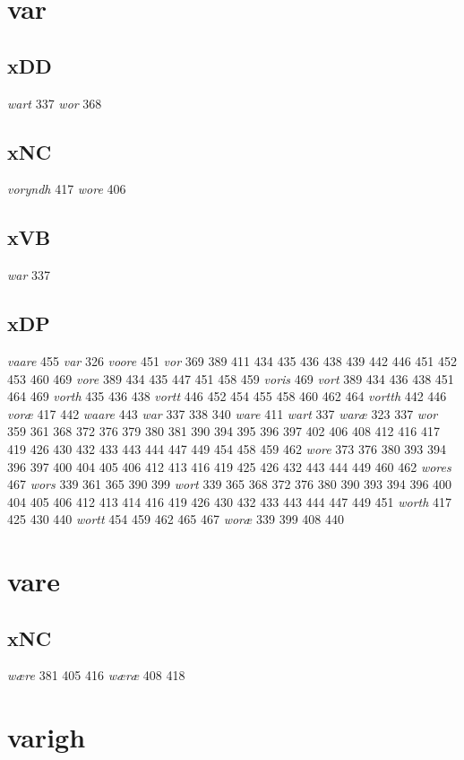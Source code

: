 \documentclass[a4paper,twocolumn]{article}
\begin{document}
\section{var}
\label{sec:org4cad62f}
\subsection{xDD}
\label{sec:org4bec692}
\emph{wart} 337 \emph{wor} 368 
\subsection{xNC}
\label{sec:org3e42ab5}
\emph{voryndh} 417 \emph{wore} 406 
\subsection{xVB}
\label{sec:org61b97c1}
\emph{war} 337 
\subsection{xDP}
\label{sec:org2201ba4}
\emph{vaare} 455 \emph{var} 326 \emph{voore} 451 \emph{vor} 369 389 411 434 435 436 438 439 442 446 451 452 453 460 469 \emph{vore} 389 434 435 447 451 458 459 \emph{voris} 469 \emph{vort} 389 434 436 438 451 464 469 \emph{vorth} 435 436 438 \emph{vortt} 446 452 454 455 458 460 462 464 \emph{vortth} 442 446 \emph{voræ} 417 442 \emph{waare} 443 \emph{war} 337 338 340 \emph{ware} 411 \emph{wart} 337 \emph{waræ} 323 337 \emph{wor} 359 361 368 372 376 379 380 381 390 394 395 396 397 402 406 408 412 416 417 419 426 430 432 433 443 444 447 449 454 458 459 462 \emph{wore} 373 376 380 393 394 396 397 400 404 405 406 412 413 416 419 425 426 432 443 444 449 460 462 \emph{wores} 467 \emph{wors} 339 361 365 390 399 \emph{wort} 339 365 368 372 376 380 390 393 394 396 400 404 405 406 412 413 414 416 419 426 430 432 433 443 444 447 449 451 \emph{worth} 417 425 430 440 \emph{wortt} 454 459 462 465 467 \emph{woræ} 339 399 408 440 
\section{vare}
\label{sec:org905ab5c}
\subsection{xNC}
\label{sec:org1840c0d}
\emph{wære} 381 405 416 \emph{wæræ} 408 418 
\section{varigh}
\label{sec:org2d05fd5}
\end{document}
